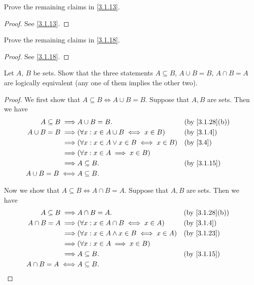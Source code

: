 \begin{ex}\label{ex:3.1.3}
  Prove the remaining claims in \cref{3.1.13}.
\end{ex}

\begin{proof}
  See \cref{3.1.13}.
\end{proof}

\begin{ex}\label{ex:3.1.4}
  Prove the remaining claims in \cref{3.1.18}.
\end{ex}

\begin{proof}
  See \cref{3.1.18}.
\end{proof}

\begin{ex}\label{ex:3.1.5}
  Let \(A\), \(B\) be sets.
  Show that the three statements \(A \subseteq B\), \(A \cup B = B\), \(A \cap B = A\) are logically equivalent (any one of them implies the other two).
\end{ex}

\begin{proof}
  We first show that \(A \subseteq B \iff A \cup B = B\).
  Suppose that \(A, B\) are sets.
  Then we have
  \begin{align*}
    A \subseteq B \implies & A \cup B = B.                                   &  & \text{(by \cref{3.1.28}(b))} \\
    A \cup B = B \implies  & (\forall x : x \in A \cup B \iff x \in B)       &  & \by{3.1.4}                   \\
    \implies               & (\forall x : x \in A \lor x \in B \iff x \in B) &  & \by{3.4}                     \\
    \implies               & (\forall x : x \in A \implies x \in B)                                            \\
    \implies               & A \subseteq B.                                  &  & \by{3.1.15}                  \\
    A \cup B = B \iff      & A \subseteq B.
  \end{align*}

  Now we show that \(A \subseteq B \iff A \cap B = A\).
  Suppose that \(A, B\) are sets.
  Then we have
  \begin{align*}
    A \subseteq B \implies & A \cap B = A.                                    &  & \text{(by \cref{3.1.28}(b))} \\
    A \cap B = A \implies  & (\forall x : x \in A \cap B \iff x \in A)        &  & \by{3.1.4}                   \\
    \implies               & (\forall x : x \in A \land x \in B \iff x \in A) &  & \by{3.1.23}                  \\
    \implies               & (\forall x : x \in A \implies x \in B)                                             \\
    \implies               & A \subseteq B.                                   &  & \by{3.1.15}                  \\
    A \cap B = A \iff      & A \subseteq B.
  \end{align*}
\end{proof}

